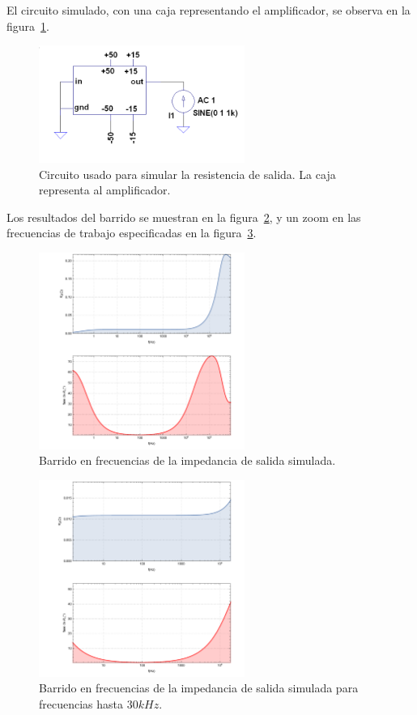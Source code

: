 \documentclass[a4paper,12pt,twoside]{article}
\begin{document}
El circuito simulado, con una caja representando el amplificador, se observa en la figura~\ref{fig:circuito_r-out-current}.


\begin{figure}[H]
	\centering
	\includegraphics[width=0.6\textwidth]{img/sim/circuito-r_out-current}
	\caption{Circuito usado para simular la resistencia de salida. La caja representa al amplificador.}
	\label{fig:circuito_r-out-current}
\end{figure}

Los resultados del barrido se muestran en la figura~\ref{fig:R_out}, y un zoom en las frecuencias de trabajo especificadas en la figura~\ref{fig:R_out-zoom}.

\begin{figure}[H]
	\centering
	\includegraphics[width=0.6\textwidth]{img/sim/R_out}
	\caption{Barrido en frecuencias de la impedancia de salida simulada.}
	\label{fig:R_out}
\end{figure}

\begin{figure}[H]
	\centering
	\includegraphics[width=0.6\textwidth]{img/sim/R_out-zoom}
	\caption{Barrido en frecuencias de la impedancia de salida simulada para frecuencias hasta $30kHz$.}
	\label{fig:R_out-zoom}
\end{figure}
\end{document}
